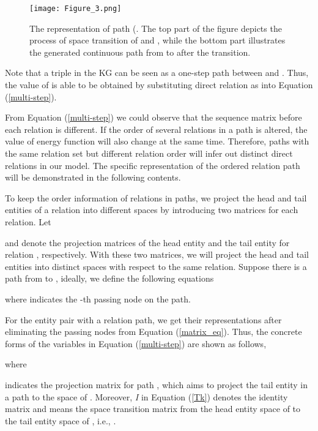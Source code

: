 \documentclass[11pt,a4paper]{article}
\begin{document}
\begin{figure*}[]
    \centering
    \texttt{[image: Figure\_3.png]}
    \caption{The representation of path  (. The top part of the figure depicts the process of space transition of  and , while the bottom part illustrates the generated continuous path from  to   after the transition.} 
\label{path}
\end{figure*}

Note that a triple  in the KG can be seen as a one-step
path between  and . Thus, the value of  is able to
be obtained by substituting direct relation  as  into
Equation (\ref{multi-step}).

From Equation (\ref{multi-step}) we could observe that the sequence
matrix  before each relation
 is different. If the order of several relations in
a path is altered, the value of energy function will also change at
the same time. Therefore, paths with the same relation set but
different relation order will infer out distinct direct relations in
our model. The specific representation of the ordered relation path
will be demonstrated in the following contents.

To keep the order information of relations in paths, we project the
head and tail entities of a relation into different spaces by
introducing two matrices for each relation. Let

and  denote the projection matrices of the head entity and
the tail entity for relation , respectively. With these two
matrices, we will project the head and tail entities into distinct
spaces with respect to the same relation. Suppose there is a
path  from  to , ideally, we define the
following equations


\newline
where  indicates the -th passing node on
the path.

For the entity pair with a relation path, we get their
representations after eliminating the passing nodes from Equation
(\ref{matrix_eq}). Thus, the concrete forms of the variables in
Equation (\ref{multi-step}) are shown as follows,




where




 indicates the projection matrix for
path , which aims to project the tail entity in a path to
the space of . Moreover, \emph{I} in Equation (\ref{Tk})
denotes the identity matrix and  means the space transition matrix from the head
entity space of  to the tail entity space of , i.e.,  .
\end{document}
